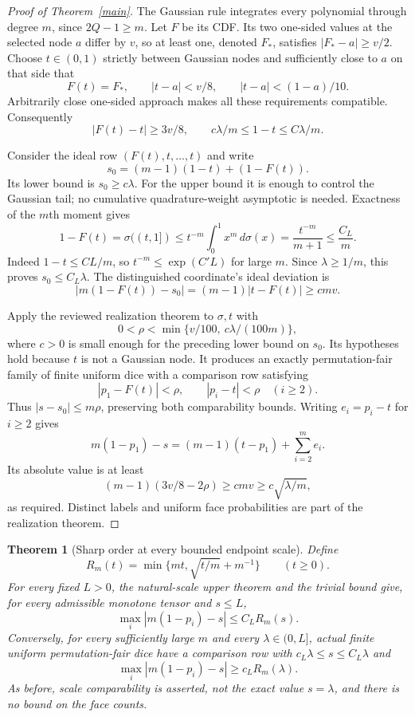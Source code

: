 \documentclass[11pt]{article}
\newtheorem{theorem}{Theorem}\newtheorem{lemma}{Lemma}
\begin{document}
\begin{proof}[Proof of Theorem~\ref{main}]
The Gaussian rule integrates every polynomial through degree $m$,
since $2Q-1\ge m$. Let $F$ be its CDF. Its two one-sided values
at the selected node $a$ differ by $v$, so at least one, denoted
$F_*$, satisfies $|F_*-a|\ge v/2$.
Choose $t\in(0,1)$ strictly between Gaussian nodes and sufficiently
close to $a$ on that side that
\[
 F(t)=F_*,\qquad |t-a|<v/8,\qquad
 |t-a|<(1-a)/10.
\]
Arbitrarily close one-sided approach makes all these requirements
compatible. Consequently
\[
 |F(t)-t|\ge3v/8,\qquad
 c\lambda/m\le1-t\le C\lambda/m.
\]

Consider the ideal row $(F(t),t,\ldots,t)$ and write
\[
 s_0=(m-1)(1-t)+(1-F(t)).
\]
Its lower bound is $s_0\ge c\lambda$. For the upper bound it is
enough to control the Gaussian tail; no cumulative quadrature-weight
asymptotic is needed. Exactness of the $m$th moment gives
\[
 1-F(t)=\sigma((t,1])
 \le t^{-m}\int_0^1x^m\,d\sigma(x)
 =\frac{t^{-m}}{m+1}\le\frac{C_L}{m}.
\]
Indeed $1-t\le CL/m$, so $t^{-m}\le\exp(C'L)$ for large $m$.
Since $\lambda\ge1/m$, this proves $s_0\le C_L\lambda$.
The distinguished coordinate's ideal deviation is
\[
 |m(1-F(t))-s_0|=(m-1)|t-F(t)|\ge c m v.
\]

Apply the reviewed realization theorem
 to $\sigma,t$ with
\[
 0<\rho<\min\{v/100,\ c\lambda/(100m)\},
\]
where $c>0$ is small enough for the preceding lower bound on $s_0$.
Its hypotheses hold because $t$ is not a Gaussian node.
It produces an exactly permutation-fair family of finite uniform
dice with a comparison row satisfying
\[
 |p_1-F(t)|<\rho,\qquad |p_i-t|<\rho\quad(i\ge2).
\]
Thus $|s-s_0|\le m\rho$, preserving both comparability bounds.
Writing $e_i=p_i-t$ for $i\ge2$ gives
\[
 m(1-p_1)-s=(m-1)(t-p_1)+\sum_{i=2}^m e_i.
\]
Its absolute value is at least
\[
 (m-1)(3v/8-2\rho)\ge c m v
       \ge c\sqrt{\lambda/m},
\]
as required. Distinct labels and uniform face probabilities are
part of the realization theorem.
\end{proof}
\begin{theorem}[Sharp order at every bounded endpoint scale]\label{allscales}
Define
\[
 R_m(t)=\min\{mt,\sqrt{t/m}+m^{-1}\}\qquad(t\ge0).
\]
For every fixed $L>0$, the natural-scale upper theorem and the trivial
bound give, for every admissible monotone tensor and $s\le L$,
\[
 \max_i|m(1-p_i)-s|\le C_L R_m(s).
\]
Conversely, for every sufficiently large $m$ and every
$\lambda\in(0,L]$, actual finite uniform permutation-fair dice have a
comparison row with $c_L\lambda\le s\le C_L\lambda$ and
\[
 \max_i|m(1-p_i)-s|\ge c_L R_m(\lambda).
\]
As before, scale comparability is asserted, not the exact value
$s=\lambda$, and there is no bound on the face counts.
\end{theorem}
\end{document}
